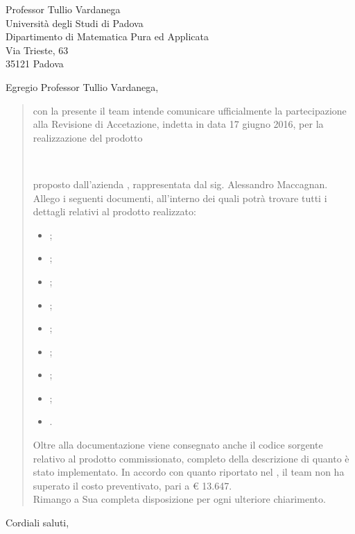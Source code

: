 \date{Padova, 17 Giugno 2016}
\begin{letter}{
	Professor Tullio Vardanega \\
	Università degli Studi di Padova \\
	Dipartimento di Matematica Pura ed Applicata \\
	Via Trieste, 63 \\
	35121 Padova
}
\signature{
\begin{center}
\textit{
\Responsabile{} \\
Responsabile \GroupName{}
}
\texttt{[image: res/MatteoDiPirro.png]}
\end{center}
}
\opening{Egregio Professor Tullio Vardanega,}
\begin{quotation}
con la presente il team \GroupName{} intende comunicare ufficialmente la partecipazione alla Revisione di Accetazione, indetta in data 17 giugno 2016, per la realizzazione del prodotto \\ 
\begin{center}
\textbf{\ProjectName{}} \\
\end{center} proposto dall'azienda \Proponente, rappresentata dal sig. Alessandro Maccagnan. \\
Allego i seguenti documenti, all'interno dei quali potrà trovare tutti i dettagli relativi al prodotto realizzato:
\begin{itemize}
\item \AnalisiDeiRequisiti{};
\item \Glossario{};
\item \NormeDiProgetto{};
\item \PianoDiProgetto{};
\item \PianoDiQualifica{};
\item \SpecificaTecnica{};
\item \ManualeUtente{};
\item \ManualeSviluppatore{};
\item \ManualeAdmin{}.
\end{itemize}
Oltre alla documentazione viene consegnato anche il codice sorgente relativo al prodotto commissionato, completo della descrizione di quanto è stato implementato.
In accordo con quanto riportato nel \PianoDiProgetto, il team non ha superato il costo preventivato, pari a \euro{} 13.647. \\
Rimango a Sua completa disposizione per ogni ulteriore chiarimento.
\end{quotation}
\closing{Cordiali saluti,}
\end{letter}
